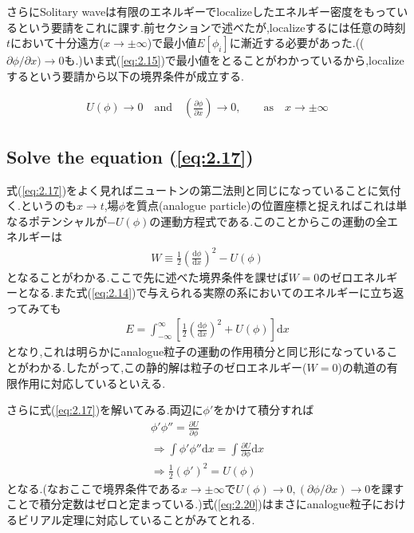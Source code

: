 \documentclass[dvipdfmx,11pt,a4paper,oneside,openany]{jsbook}
\begin{document}
さらにSolitary waveは有限のエネルギーでlocalizeしたエネルギー密度をもっているという要請をこれに課す.前セクションで述べたが,localizeするには任意の時刻$t$において十分遠方($x\rightarrow \pm\infty$)で最小値$E[\phi_i]$に漸近する必要があった.(($\partial\phi/\partial x)\rightarrow 0$も.)いま式(\ref{eq:2.15})で最小値をとることがわかっているから,localizeするという要請から以下の境界条件が成立する.
\begin{screen}
    \begin{align*}
        U(\phi)\rightarrow0 \quad \text{and} \quad \left(\frac{\partial\phi}{\partial x}\right)\rightarrow 0,\qquad \text{as}\quad x\rightarrow \pm \infty
    \end{align*}
\end{screen}

\subsection{Solve the equation (\ref{eq:2.17})}
式(\ref{eq:2.17})をよく見ればニュートンの第二法則と同じになっていることに気付く.というのも$x\rightarrow t$,場$\phi$を質点(analogue particle)の位置座標と捉えればこれは単なるポテンシャルが$-U(\phi)$の運動方程式である.このことからこの運動の全エネルギーは
\begin{align}
    W \equiv \frac{1}{2}\left(\frac{\mathrm{d} \phi}{\mathrm{d}x}\right)^{2}-U(\phi)\label{eq:2.18}
\end{align}
となることがわかる.ここで先に述べた境界条件を課せば$W=0$のゼロエネルギーとなる.また式(\ref{eq:2.14})で与えられる実際の系においてのエネルギーに立ち返ってみても
\begin{align}
    E=\int_{-\infty}^{\infty}\left[\frac{1}{2}\left(\frac{\mathrm{d}\phi}{\mathrm{d}x}\right)^2+U(\phi)\right]\mathrm{d}x
\end{align}
となり,これは明らかにanalogue粒子の運動の作用積分と同じ形になっていることがわかる.したがって,この静的解は粒子のゼロエネルギー($W=0$)の軌道の有限作用に対応しているといえる.

さらに式(\ref{eq:2.17})を解いてみる.両辺に$\phi'$をかけて積分すれば
\begin{align}
    \phi'\phi''=\frac{\partial U}{\partial\phi}\nonumber                                            \\
    \Rightarrow \int\phi'\phi''\mathrm{d}x=\int\frac{\partial U}{\partial \phi}\mathrm{d}x\nonumber \\
    \Rightarrow \frac{1}{2}\left(\phi'\right)^2=U(\phi)\label{eq:2.20}
\end{align}
となる.(なおここで境界条件である$x\rightarrow \pm \infty$で$U(\phi)\rightarrow 0, (\partial \phi/\partial x)\rightarrow 0$を課すことで積分定数はゼロと定まっている.)式(\ref{eq:2.20})はまさにanalogue粒子におけるビリアル定理に対応していることがみてとれる.
\end{document}
